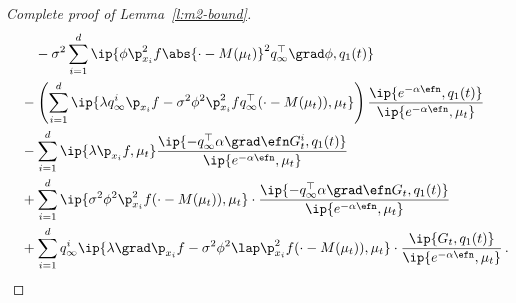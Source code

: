 \documentclass{amsart}
\begin{document}
\begin{proof}[Complete proof of Lemma~\ref{l:m2-bound}]
\begin{align}
		& \qquad - \sigma^2 \sum_{i=1}^d \ip{\phi \p_{x_i}^2 f \abs{\cdot-M(\mu_t)}^2 q_\infty^\top \grad \phi, q_1(t)} \\
		& \quad - \left( \sum_{i=1}^d  \ip{\lambda q_\infty^i \p_{x_i} f - \sigma^2 \phi^2 \p_{x_i}^2 f q_\infty^\top (\cdot-M(\mu_t)),\mu_t} \right) \frac{\ip{e^{-\alpha\efn}, q_1(t)}}{\ip{e^{-\alpha\efn}, \mu_t}} \\
		& \quad - \sum_{i=1}^d \ip{\lambda \p_{x_i}f , \mu_t }  \frac{\ip{- q_\infty^\top \alpha \grad \efn G_t^i, q_1(t)}}{\ip{e^{-\alpha\efn},\mu_t}} \\
		& \quad + \sum_{i=1}^d \ip{\sigma^2 \phi^2 \p_{x_i}^2 f (\cdot-M(\mu_t)), \mu_t} \cdot \frac{\ip{- q_\infty^\top \alpha \grad \efn G_t, q_1(t)}}{\ip{e^{-\alpha\efn},\mu_t}}  \\
		\label{e:r-diff-term-2}
		& \quad + \sum_{i=1}^d q_\infty^i \ip{\lambda \grad \p_{x_i} f - \sigma^2 \phi^2 \lap \p_{x_i}^2 f (\cdot-M(\mu_t)), \mu_t} \cdot \frac{\ip{G_t, q_1(t)}}{\ip{e^{-\alpha \efn},\mu_t}} \,.
	\end{align}


\end{proof}
\end{document}
